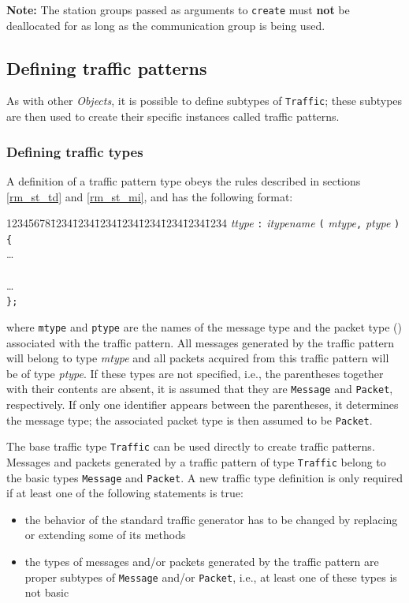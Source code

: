 \medskip

\noindent
{\bf Note:} The station groups passed as arguments to {\tt create} must
{\bf not}
be deallocated for as long as the communication group is being used.

\medskip


\subsection{Defining traffic patterns}
\label{rm_cl_dt}

As with other {\em Objects}, it is possible to define subtypes of
{\tt Traffic};
these subtypes are then used to create their specific
instances called traffic patterns.

\subsubsection{Defining traffic types}
\label{rm_cl_dt_tt}

A definition of a traffic pattern type obeys the rules described in
sections \ref{rm_st_td} and \ref{rm_st_mi}, and has the following format:
{\tt\begin{tabbing}
12345678\=1234\=1234\=1234\=1234\=1234\=1234\=1234\=1234\kill
{} {\em ttype\/} {\tt :} {\em itypename\/} {\tt (} {\em mtype}{\tt ,} {\em ptype\/} {\tt ) \{} \\
\> \>\ldots \\
\>  \\
\> \>\ldots \\
\> {\tt \};}
\end{tabbing}}
\noindent
where {\tt mtype} and {\tt ptype} are the names of the message type
and the packet type
() associated with the traffic pattern.
All messages generated by the traffic pattern will belong to type
{\em mtype\/} and
all packets acquired from this traffic pattern will be of type {\em ptype}.
If these types are not specified, i.e., the parentheses together with their
contents are absent, it is assumed that they are {\tt Message} and 
{\tt Packet}, respectively.
If only one identifier appears between the parentheses, it determines the
message type; the associated packet type is then assumed to be {\tt Packet}.

The base traffic type {\tt Traffic} can be used directly to create
traffic patterns.
Messages and packets generated by a traffic pattern of type {\tt Traffic}
belong to the basic types {\tt Message} and {\tt Packet}.
A new traffic type definition is only required if at least one of the
following statements is true:
\begin{itemize}
\item
the behavior of the standard traffic generator has to be changed by replacing
or extending some of its methods
\item
the types of messages and/or packets generated by the traffic pattern are proper
subtypes of {\tt Message} and/or {\tt Packet}, i.e., at least
one of these types is not basic
\end{itemize}

